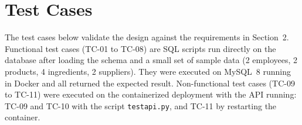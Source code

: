 \documentclass[11pt]{article}
\renewcommand{\_}{\oldunderscore\allowbreak}
\begin{document}
\section{Test Cases}
\label{sec:test-cases}

The test cases below validate the design against the requirements in Section~2. Functional test cases (TC-01 to TC-08) are SQL scripts run directly on the database after loading the schema and a small set of sample data (2 employees, 2 products, 4 ingredients, 2 suppliers). They were executed on MySQL~8 running in Docker and all returned the expected result. Non-functional test cases (TC-09 to TC-11) were executed on the containerized deployment with the API running: TC-09 and TC-10 with the script \texttt{test\_api.py}, and TC-11 by restarting the container.
\end{document}
